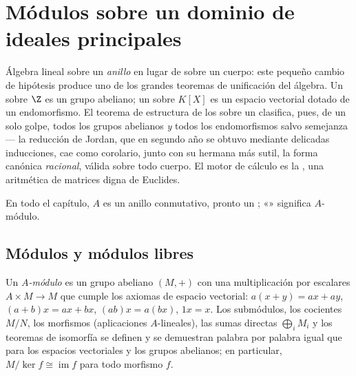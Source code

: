 \chapter{Módulos sobre un dominio de ideales
principales}\label{ch:b3:modules}

Álgebra lineal sobre un \emph{anillo} en lugar de sobre un cuerpo: este
pequeño cambio de hipótesis produce uno de los grandes teoremas de
unificación del álgebra. Un  sobre
$\Z$ es un grupo abeliano; un 
sobre $K[X]$ es un espacio vectorial dotado de un endomorfismo. El
teorema de estructura de los  sobre un 
clasifica, pues, de un solo golpe, todos los grupos abelianos
 \emph{y} todos los
endomorfismos salvo semejanza --- la reducción de Jordan, que en segundo
año se obtuvo mediante delicadas inducciones, cae como corolario, junto
con su hermana más sutil, la forma canónica \emph{racional}, válida
sobre todo cuerpo. El motor de cálculo es la
, una aritmética de
matrices digna de Euclides.

En todo el capítulo, $A$ es un anillo conmutativo, pronto un
;
«» significa $A$-módulo.

\section{Módulos y módulos libres}

\begin{definition}\label{def:b3:modules:module}
Un \emph{$A$-módulo} es un grupo abeliano $(M, +)$ con una
multiplicación por escalares $A \times M \to M$ que cumple los axiomas
de espacio vectorial: $a(x + y) = ax + ay$, $(a + b)x = ax + bx$,
$(ab)x = a(bx)$, $1x = x$. Los submódulos, los cocientes $M/N$, los
morfismos (aplicaciones $A$-lineales), las sumas directas
$\bigoplus_i M_i$ y los teoremas de isomorfía se definen y se demuestran
palabra por palabra igual que para los espacios vectoriales y los grupos
abelianos; en particular, $M/\ker f \cong
\operatorname{im} f$ para todo morfismo $f$.
\end{definition}

